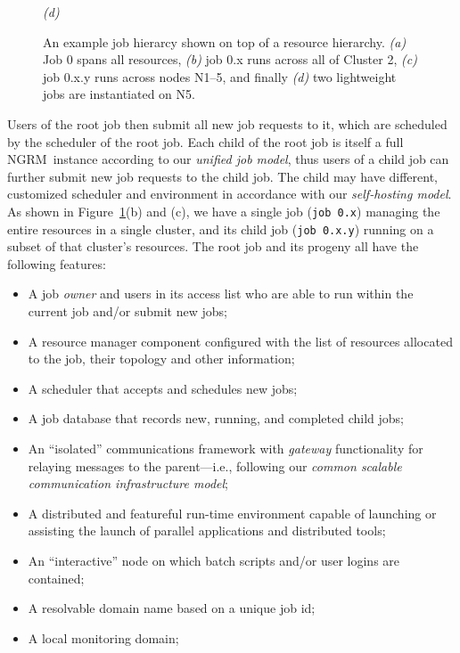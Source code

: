 \documentclass[10pt]{article}
\newcommand{\ngrm}{NGRM}
\begin{document}
\begin{figure}
\begin{minipage}{0.5\linewidth}
\begin{center}
  {\em (d)}
  \end{center}
\end{minipage}
\caption[Job Hierarchy Example]{{\small An example job hierarcy shown on top
of a resource hierarchy.
{\em (a)} Job 0 spans all resources,
{\em (b)} job 0.x runs across all of {\sc Cluster 2},
{\em (c)} job 0.x.y runs across nodes N1--5, and finally
{\em (d)} two lightweight jobs are instantiated on N5.}}
\label{fig:JobHierarchy}
\end{figure}

Users of the root job then submit all new job requests to it, which are scheduled
by the scheduler of the root job. 
Each child of the root job is itself a full \ngrm\ instance according to 
our {\em unified job model}, thus users of a child job can further submit new job requests 
to the child job. The child may have different, customized scheduler and environment 
in accordance with our {\em self-hosting model}.
As shown in Figure~\ref{fig:JobHierarchy}(b) and (c),
we have a single job ({\tt job 0.x}) managing the entire resources in a single cluster, 
and its child job ({\tt job 0.x.y}) running on a subset of that cluster's resources.
The root job and its progeny all have the following features:
\begin{itemize}
\item{A job {\em owner} and users in its access list who are able to run
      within the current job and/or submit new jobs;}
\item{A resource manager component configured with the list of
      resources allocated to the job, their topology and other information;}
\item{A scheduler that accepts and schedules new jobs;}
\item{A job database that records new, running, and completed child jobs;}
\item{An ``isolated'' communications framework with {\em gateway} functionality
      for relaying messages to the parent---i.e., following our {\em common scalable communication infrastructure model};}
\item{A distributed and featureful run-time environment capable of launching
      or assisting the launch of parallel applications and distributed tools;}
\item{An ``interactive'' node on which batch scripts and/or user logins
       are contained;}
\item{A resolvable domain name based on a unique job id;}
\item{A local monitoring domain;}
\end{itemize}
\end{document}

